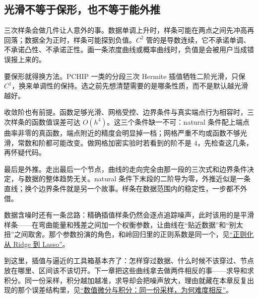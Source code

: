 \subsection{光滑不等于保形，也不等于能外推}

三次样条会做几件让人意外的事。数据单调上升时，样条可能在两点之间先冲高再回落；数据全为正时，样条可能探到负值。\(C^2\) 管的是导数连续，它不承诺单调、不承诺凸性、不承诺正性。画一条浓度曲线或概率曲线时，负值是会被用户当成错误报上来的。

要保形就得换方法。PCHIP 一类的分段三次 Hermite 插值牺牲二阶光滑，只保 \(C^1\)，换来单调性的保持。选之前先想清楚需要的是哪条性质，而不是默认越光滑越好。

收敛阶也有前提。函数足够光滑、网格受控、边界条件与真实端点行为相容时，三次样条的函数值误差可达 \(O(h^4)\)。这三个条件缺一不可：natural 条件配上端点曲率非零的真函数，端点附近的精度会明显掉一档；网格严重不均或函数不够光滑，常数和阶都可能改变。做网格加密实验时若看到的阶不是 \(4\)，先检查这几条，再怀疑代码。

最后是外推。走出最后一个节点，曲线的走向完全由那一段的三次式和边界条件决定，与数据的整体趋势无关。natural 条件下末段的二阶导为零，外推近似是一条直线；换个边界条件就是另一个故事。样条在数据范围内的稳定性，一步都不外借。

数据含噪时还有一条岔路：精确插值样条仍然会逐点追踪噪声，此时该用的是平滑样条——在弯曲能量和残差之间加一个权衡参数，让曲线在``贴近数据''和``别太扭''之间取舍。那个参数扮演的角色，和岭回归里的正则系数是同一个，见\hyperref[sec:13-Machine-Learning/02-Linear-Models/02]{``正则化从 Ridge 到 Lasso''}。

到这里，插值与逼近的工具箱基本齐了：怎样穿过数据、什么时候不该穿过、节点放在哪里、区间该不该切开。下一章把这些曲线拿去做两件相反的事——求导和求积分。同一份采样，积分越加越准，求导却会把噪声放大，理由就藏在本章反复出现的那个误差结构里，见\hyperref[ch:064]{``数值微分与积分：同一份采样，为何难度相反''}。
